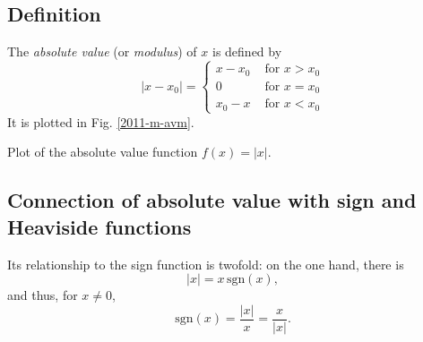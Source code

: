 \subsection{Definition}
The {\em absolute value} (or {\em modulus})
of $x$ is defined by
\begin{equation}
\left|
x-x_0\right|
=
\left\{
\begin{array}{ll}
x-x_0&\textrm{ for } x > x_0\\
0&\textrm{ for } x = x_0\\
x_0-x&\textrm{ for } x < x_0
\end{array}
\right.
\label{2011-m-di-avm}
\end{equation}
It is plotted in Fig. \ref{2011-m-avm}.
\begin{marginfigure}
\begin{center}
\caption{Plot of the absolute value function $f(x)=\left|x\right|$.}
\label{2011-m-avm}
\end{center}
\end{marginfigure}

\subsection{Connection of absolute value with sign and Heaviside functions}

Its relationship to the sign function is twofold:
on the one hand, there is
 \begin{equation}
 \left|x\right| = x \,\textrm{sgn} (x),
 \end{equation}
and thus, for $x\neq 0$,
 \begin{equation}
\textrm{sgn} (x)  = \frac{\left|x\right|}{x} = \frac{x}{\left|x\right|}.
 \end{equation}

